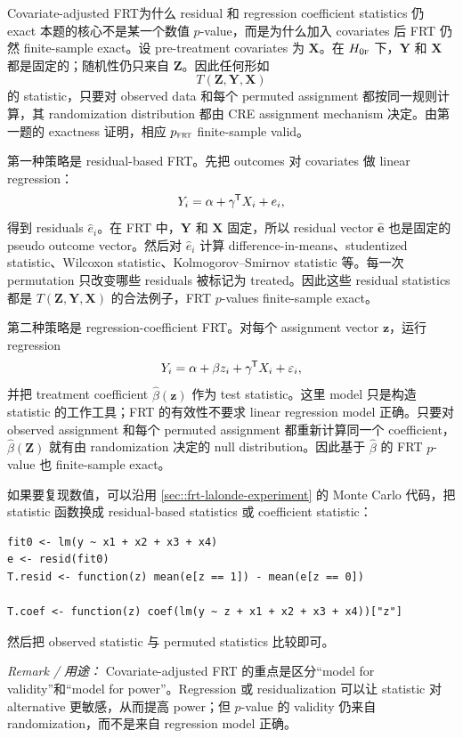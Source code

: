 \begin{exercisesolution}{Covariate-adjusted FRT}{为什么 residual 和 regression coefficient statistics 仍 exact}
本题的核心不是某一个数值 $p$-value，而是为什么加入 covariates 后 FRT 仍然 finite-sample exact。设 pre-treatment covariates 为 $\boldsymbol{X}$。在 $H_{0\textsc{f}}$ 下，$\boldsymbol{Y}$ 和 $\boldsymbol{X}$ 都是固定的；随机性仍只来自 $\boldsymbol{Z}$。因此任何形如
\[
T(\boldsymbol{Z},\boldsymbol{Y},\boldsymbol{X})
\]
的 statistic，只要对 observed data 和每个 permuted assignment 都按同一规则计算，其 randomization distribution 都由 CRE assignment mechanism 决定。由第一题的 exactness 证明，相应 $p_{\textsc{frt}}$ finite-sample valid。

第一种策略是 residual-based FRT。先把 outcomes 对 covariates 做 linear regression：
\[
Y_i=\alpha+\gamma^{\mkern-1.5mu\mathsf{T}} X_i+e_i,
\]
得到 residuals $\hat e_i$。在 FRT 中，$\boldsymbol{Y}$ 和 $\boldsymbol{X}$ 固定，所以 residual vector $\hat{\boldsymbol e}$ 也是固定的 pseudo outcome vector。然后对 $\hat e_i$ 计算 difference-in-means、studentized statistic、Wilcoxon statistic、Kolmogorov--Smirnov statistic 等。每一次 permutation 只改变哪些 residuals 被标记为 treated。因此这些 residual statistics 都是 $T(\boldsymbol{Z},\boldsymbol{Y},\boldsymbol{X})$ 的合法例子，FRT $p$-values finite-sample exact。

第二种策略是 regression-coefficient FRT。对每个 assignment vector $\boldsymbol{z}$，运行 regression
\[
Y_i=\alpha+\beta z_i+\gamma^{\mkern-1.5mu\mathsf{T}} X_i+\varepsilon_i,
\]
并把 treatment coefficient $\hat\beta(\boldsymbol{z})$ 作为 test statistic。这里 model 只是构造 statistic 的工作工具；FRT 的有效性不要求 linear regression model 正确。只要对 observed assignment 和每个 permuted assignment 都重新计算同一个 coefficient，$\hat\beta(\boldsymbol{Z})$ 就有由 randomization 决定的 null distribution。因此基于 $\hat\beta$ 的 FRT $p$-value 也 finite-sample exact。

如果要复现数值，可以沿用 \cref{sec::frt-lalonde-experiment} 的 Monte Carlo 代码，把 statistic 函数换成 residual-based statistics 或 coefficient statistic：
\begin{lstlisting}
fit0 <- lm(y ~ x1 + x2 + x3 + x4)
e <- resid(fit0)
T.resid <- function(z) mean(e[z == 1]) - mean(e[z == 0])

T.coef <- function(z) coef(lm(y ~ z + x1 + x2 + x3 + x4))["z"]
\end{lstlisting}
然后把 observed statistic 与 permuted statistics 比较即可。

\emph{Remark / 用途：} Covariate-adjusted FRT 的重点是区分“model for validity”和“model for power”。Regression 或 residualization 可以让 statistic 对 alternative 更敏感，从而提高 power；但 $p$-value 的 validity 仍来自 randomization，而不是来自 regression model 正确。
\end{exercisesolution}

